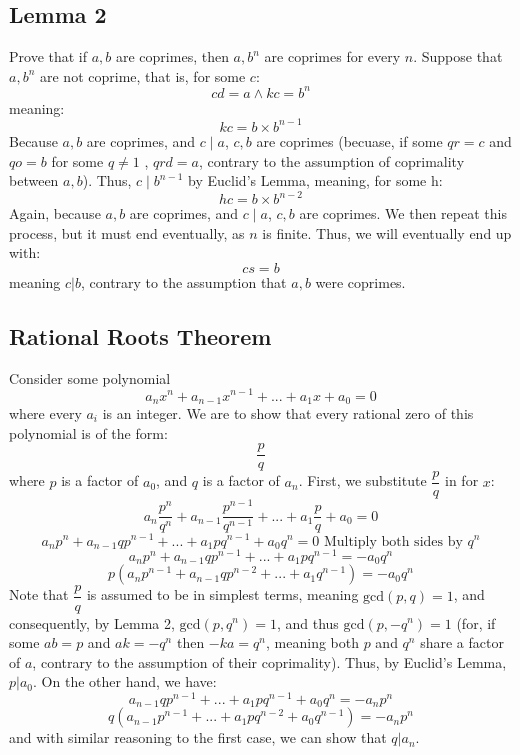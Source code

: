 \documentclass{article}
\theoremstyle{definition}
\begin{document}
\newpage
\subsection*{Lemma 2}
Prove that if $a,b$ are coprimes, then $a,b^n$ are coprimes for every $n$.\newline
Suppose that $a,b^n$ are not coprime, that is, for some $c$:
\[ cd=a\wedge kc=b^n \]
meaning:
\[ kc=b\times b^{n-1} \]
Because $a,b$ are coprimes, and $c\mid a$, $c,b$ are coprimes (becuase, if some $qr=c$ and $qo=b$ for some $q\ne 1$ 
, $qrd=a$, contrary to the assumption 
of coprimality between $a,b$). Thus, $c\mid b^{n-1}$ by Euclid's Lemma, meaning, for some h:
\[ hc=b\times b^{n-2} \] 
Again, because $a,b$ are coprimes, and $c\mid a$, $c,b$ are coprimes. We then repeat this process, but it must end eventually, as $n$ is finite. 
Thus, we will eventually end up with:
\[ cs=b \]
meaning $c|b$, contrary to the assumption that $a,b$ were coprimes.


\newpage
\subsection*{Rational Roots Theorem}
Consider some polynomial
\[ a_nx^n+a_{n-1}x^{n-1}+...+a_1x+a_0=0 \]
where every $a_i$ is an integer. We are to show that every rational zero of this polynomial is of the form:
\[ \frac{p}{q} \] where $p$ is a factor of $a_0$, and $q$ is a factor of $a_n$. First, we substitute $\dfrac{p}{q}$ in for $x$:
\[ a_n\frac{p^n}{q^n}+a_{n-1}\frac{p^{n-1}}{q^{n-1}}+...+a_1\frac{p}{q}+a_0=0 \]
\[ a_np^n+a_{n-1}qp^{n-1}+...+a_1pq^{n-1}+a_0q^n=0\textrm{ Multiply both sides by $q^n$} \]
\[ a_np^n+a_{n-1}qp^{n-1}+...+a_1pq^{n-1}=-a_0q^n \]
\[ p(a_np^{n-1}+a_{n-1}qp^{n-2}+...+a_1q^{n-1})=-a_0q^n \]
Note that $\dfrac{p}{q}$ is assumed to be in simplest terms, meaning $\textrm{gcd}(p,q)=1$, and consequently, by Lemma 2, 
$\textrm{gcd}(p,q^n)=1$, and thus $\textrm{gcd}(p,-q^n)=1$ (for, if some $ab=p$ and $ak=-q^n$ then $-ka=q^n$, meaning both $p$ and $q^n$ share a factor 
of $a$, contrary to the assumption of their coprimality). 
Thus, by Euclid's Lemma, $p|a_0$. On the other hand, we have:
\[ a_{n-1}qp^{n-1}+...+a_1pq^{n-1}+a_0q^n=-a_np^n \] 
\[ q(a_{n-1}p^{n-1}+...+a_1pq^{n-2}+a_0q^{n-1})=-a_np^n \]
and with similar reasoning to the first case, we can show that $q|a_n$.
\end{document}

